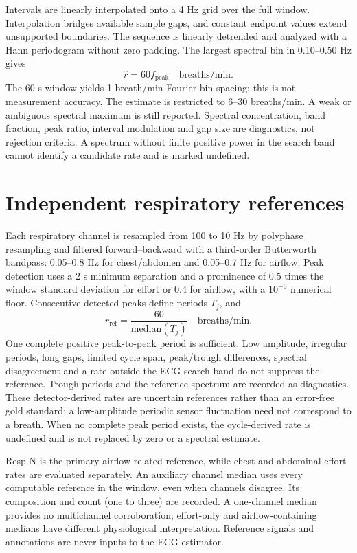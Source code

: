 Intervals are linearly interpolated onto a 4 Hz grid over the full window. Interpolation bridges available sample gaps, and constant endpoint values extend unsupported boundaries. The sequence is linearly detrended and analyzed with a Hann periodogram without zero padding. The largest spectral bin in 0.10--0.50 Hz gives
\begin{equation}
\widehat r=60f_{\mathrm{peak}}\quad\text{breaths/min}.
\end{equation}
The 60 s window yields 1 breath/min Fourier-bin spacing; this is not measurement accuracy. The estimate is restricted to 6--30 breaths/min. A weak or ambiguous spectral maximum is still reported. Spectral concentration, band fraction, peak ratio, interval modulation and gap size are diagnostics, not rejection criteria. A spectrum without finite positive power in the search band cannot identify a candidate rate and is marked undefined.

\section{Independent respiratory references}
Each respiratory channel is resampled from 100 to 10 Hz by polyphase resampling and filtered forward--backward with a third-order Butterworth bandpass: 0.05--0.8 Hz for chest/abdomen and 0.05--0.7 Hz for airflow. Peak detection uses a 2 s minimum separation and a prominence of 0.5 times the window standard deviation for effort or 0.4 for airflow, with a $10^{-9}$ numerical floor. Consecutive detected peaks define periods $T_j$, and
\begin{equation}
r_{\mathrm{ref}}=\frac{60}{\mathrm{median}(T_j)}\quad\text{breaths/min}.
\end{equation}
One complete positive peak-to-peak period is sufficient. Low amplitude, irregular periods, long gaps, limited cycle span, peak/trough differences, spectral disagreement and a rate outside the ECG search band do not suppress the reference. Trough periods and the reference spectrum are recorded as diagnostics. These detector-derived rates are uncertain references rather than an error-free gold standard; a low-amplitude periodic sensor fluctuation need not correspond to a breath. When no complete peak period exists, the cycle-derived rate is undefined and is not replaced by zero or a spectral estimate.

Resp N is the primary airflow-related reference, while chest and abdominal effort rates are evaluated separately. An auxiliary channel median uses every computable reference in the window, even when channels disagree. Its composition and count (one to three) are recorded. A one-channel median provides no multichannel corroboration; effort-only and airflow-containing medians have different physiological interpretation. Reference signals and annotations are never inputs to the ECG estimator.

